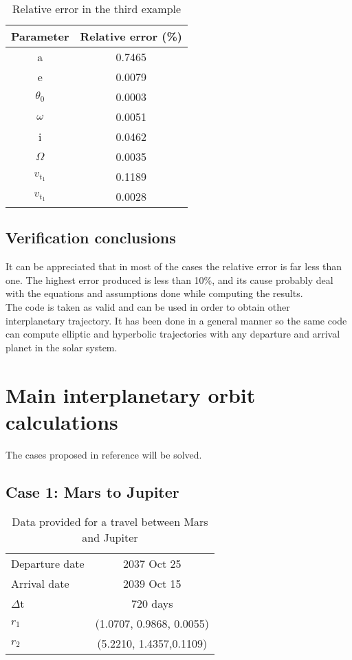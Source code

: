 \begin{table}[H]
\centering
\begin{tabular}{|cc|}
\hline
\textbf{Parameter}   & \textbf{Relative error (\%)} \\ \hline
a           & 0.7465              \\
e           & 0.0079              \\
$\theta _0$ & 0.0003              \\
$\omega$    & 0.0051              \\
i           & 0.0462              \\
$\Omega$    & 0.0035              \\
$v_{t_1}$   & 0.1189              \\
$v_{t_1}$   & 0.0028              \\ \hline
\end{tabular}
\caption{Relative error in the third example}
\end{table}
\subsection{Verification conclusions}
It can be appreciated that in most of the cases the relative error is far less than one. The highest error produced is less than 10\%, and its cause probably deal with the equations and assumptions done while computing the results.\\
The code is taken as valid and can be used in order to obtain other interplanetary trajectory. It has been done in a general manner so the same code can compute elliptic and hyperbolic trajectories with any departure and arrival planet in the solar system. 

\section{Main interplanetary orbit calculations}
The cases proposed in reference \cite{CalafEnunciat} will be solved. 
\subsection{Case 1: Mars to Jupiter}

\begin{table}[H]
\centering
\begin{tabular}{|lc|}
\hline
Departure date              & 2037 Oct 25                \\ 
Arrival date                & 2039 Oct 15 \\ 
$\Delta$t                    & 720 days                   \\ 
$r_1$                          & (1.0707, 0.9868, 0.0055)  \\ 
$r_2$                          & (5.2210, 1.4357,0.1109)   \\ \hline
\end{tabular}
\caption{Data provided for a travel between Mars and Jupiter}
\end{table}

